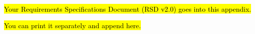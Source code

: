 \hl{Your Requirements Specifications Document (RSD v2.0) goes into this appendix.}

\hl{You can print it separately and append here.}

